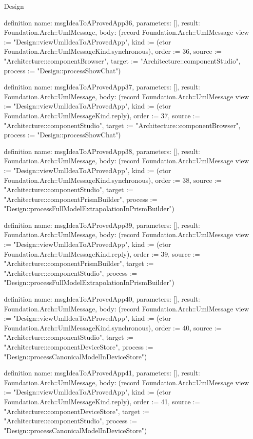 \begin{lexlean}{Design}
\begin{semanticmodule}
definition{
  name: msgIdeaToAProvedApp36,
  parameters: [],
  result: Foundation.Arch::UmlMessage,
  body: (record Foundation.Arch::UmlMessage {view := "Design::viewUmlIdeaToAProvedApp", kind := (ctor Foundation.Arch::UmlMessageKind.synchronous), order := 36, source := "Architecture::componentBrowser", target := "Architecture::componentStudio", process := "Design::processShowChat"})
}

definition{
  name: msgIdeaToAProvedApp37,
  parameters: [],
  result: Foundation.Arch::UmlMessage,
  body: (record Foundation.Arch::UmlMessage {view := "Design::viewUmlIdeaToAProvedApp", kind := (ctor Foundation.Arch::UmlMessageKind.reply), order := 37, source := "Architecture::componentStudio", target := "Architecture::componentBrowser", process := "Design::processShowChat"})
}

definition{
  name: msgIdeaToAProvedApp38,
  parameters: [],
  result: Foundation.Arch::UmlMessage,
  body: (record Foundation.Arch::UmlMessage {view := "Design::viewUmlIdeaToAProvedApp", kind := (ctor Foundation.Arch::UmlMessageKind.synchronous), order := 38, source := "Architecture::componentStudio", target := "Architecture::componentPrismBuilder", process := "Design::processFullModelExtrapolationInPrismBuilder"})
}

definition{
  name: msgIdeaToAProvedApp39,
  parameters: [],
  result: Foundation.Arch::UmlMessage,
  body: (record Foundation.Arch::UmlMessage {view := "Design::viewUmlIdeaToAProvedApp", kind := (ctor Foundation.Arch::UmlMessageKind.reply), order := 39, source := "Architecture::componentPrismBuilder", target := "Architecture::componentStudio", process := "Design::processFullModelExtrapolationInPrismBuilder"})
}

definition{
  name: msgIdeaToAProvedApp40,
  parameters: [],
  result: Foundation.Arch::UmlMessage,
  body: (record Foundation.Arch::UmlMessage {view := "Design::viewUmlIdeaToAProvedApp", kind := (ctor Foundation.Arch::UmlMessageKind.synchronous), order := 40, source := "Architecture::componentStudio", target := "Architecture::componentDeviceStore", process := "Design::processCanonicalModelInDeviceStore"})
}

definition{
  name: msgIdeaToAProvedApp41,
  parameters: [],
  result: Foundation.Arch::UmlMessage,
  body: (record Foundation.Arch::UmlMessage {view := "Design::viewUmlIdeaToAProvedApp", kind := (ctor Foundation.Arch::UmlMessageKind.reply), order := 41, source := "Architecture::componentDeviceStore", target := "Architecture::componentStudio", process := "Design::processCanonicalModelInDeviceStore"})
}


\end{semanticmodule}
\end{lexlean}

